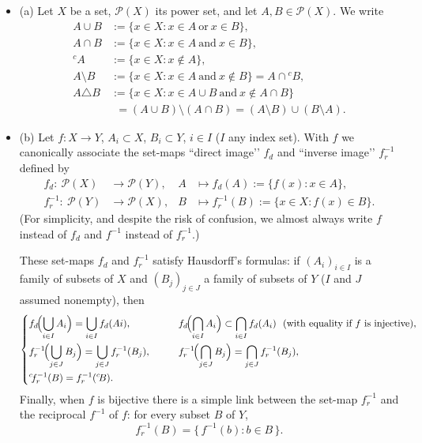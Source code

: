 \documentclass[11pt]{article}
\theoremstyle{definition}
\begin{document}
\medskip\noindent
\begin{itemize}
\item (a) Let $X$ be a set, $\mathcal P(X)$ its power set, and let $A,B\in\mathcal P(X)$. We write
\[
\begin{aligned}
A\cup B &:= \{x\in X: x\in A\ \text{or}\ x\in B\},\\
A\cap B &:= \{x\in X: x\in A\ \text{and}\ x\in B\},\\
{}^{c}\!A &:= \{x\in X: x\notin A\},\\
A\setminus B &:= \{x\in X: x\in A\ \text{and}\ x\notin B\}=A\cap{}^{c}\!B,\\
A\triangle B &:= \{x\in X: x\in A\cup B\ \text{and}\ x\notin A\cap B\}\\
&\phantom{:}= (A\cup B)\setminus(A\cap B)=(A\setminus B)\cup(B\setminus A).
\end{aligned}
\]
\medskip\noindent
\item (b) Let $f:X\to Y$, $A_i\subset X$, $B_i\subset Y$, $i\in I$ ($I$ any index set). With $f$ we canonically associate the set-maps “direct image’’ $f_d$ and “inverse image’’ $f_r^{-1}$ defined by
\[
\begin{aligned}
f_d:\ \mathcal P(X) &\longrightarrow \mathcal P(Y), & A &\longmapsto f_d(A):=\{f(x):x\in A\},\\
f_r^{-1}:\ \mathcal P(Y) &\longrightarrow \mathcal P(X), & B &\longmapsto f_r^{-1}(B):=\{x\in X: f(x)\in B\}.
\end{aligned}
\]
(For simplicity, and despite the risk of confusion, we almost always write $f$ instead of $f_d$ and $f^{-1}$ instead of $f_r^{-1}$.)

These set-maps $f_d$ and $f_r^{-1}$ satisfy Hausdorff’s formulas: if $(A_i)_{i\in I}$ is a family of subsets of $X$ and $(B_j)_{j\in J}$ a family of subsets of $Y$ ($I$ and $J$ assumed nonempty), then
\[
\left\{
\begin{aligned}
&f_d\!\Bigl(\bigcup_{i\in I}A_i\Bigr)=\bigcup_{i\in I} f_d(Ai),\qquad
&&f_d\!\Bigl(\bigcap_{i\in I}A_i\Bigr)\subset\bigcap_{i\in I} f_d(A_i)\ \ \text{(with equality if $f$ is injective)},\\
&f_r^{-1}\!\Bigl(\bigcup_{j\in J}B_j\Bigr)=\bigcup_{j\in J} f_r^{-1}(B_j),\qquad
&&f_r^{-1}\!\Bigl(\bigcap_{j\in J}B_j\Bigr)=\bigcap_{j\in J} f_r^{-1}(B_j),\\
&{}^{c}\!f_r^{-1}(B)=f_r^{-1}({}^{c}\!B).
\end{aligned}
\right.
\]
Finally, when $f$ is bijective there is a simple link between the set-map $f_r^{-1}$ and the reciprocal $f^{-1}$ of $f$: for every subset $B$ of $Y$,
\[
f_r^{-1}(B)=\{\,f^{-1}(b): b\in B\,\}.
\]


\end{itemize}
\end{document}
